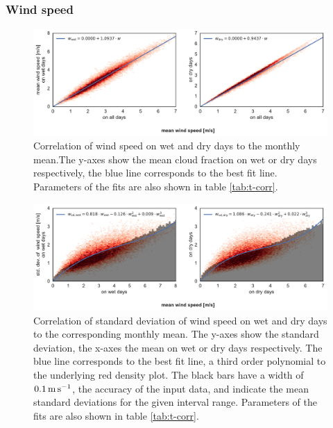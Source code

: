 \documentclass[
11pt, %
english, %
singlespacing, %
headsepline, %
]{MastersDoctoralThesis} %
\makeatletter
\DeclareRobustCommand*\unit[1]%
{\ensuremath{%
		{\thinmuskip3mu\relax
			\def\mu{\text{\textmu}}\def~{\,}%
			\ifx\f@series\testbx\mathbf{#1}\else\mathrm{#1}\fi}}}
\makeatother
\begin{document}
\begin{NoHyper}
\begin{refsection}
\subsubsection{Wind speed}
\begin{figure}
	\includegraphics[width=\linewidth]{gwgen-figures/f10.pdf}
	\caption[Correlation of wind speed on wet and dry days to the monthly mean]{Correlation of wind speed on wet and dry days to the monthly mean.The y-axes show the mean cloud fraction on wet or dry days respectively, the blue line corresponds to the best fit line. Parameters of the fits are also shown in table \ref{tab:t-corr}.}
	\label{fig:wind}
\end{figure}
\begin{figure}
	\includegraphics[width=\linewidth]{gwgen-figures/f11.pdf}
	\caption[Correlation of standard deviation of wind speed to the monthly mean]{Correlation of standard deviation of wind speed on wet and dry days to the corresponding monthly mean. The y-axes show the standard deviation, the x-axes the mean on wet or dry days respectively. The blue line corresponds to the best fit line, a third order polynomial to the underlying red density plot. The black bars have a width of $0.1\, \unit{m}\, \unit{s}^{-1}$, the accuracy of the input data, and indicate the mean standard deviations for the given interval range. Parameters of the fits are also shown in table \ref{tab:t-corr}.}
	\label{fig:wind_sd}
\end{figure}


\end{refsection}
\end{NoHyper}
\end{document}
